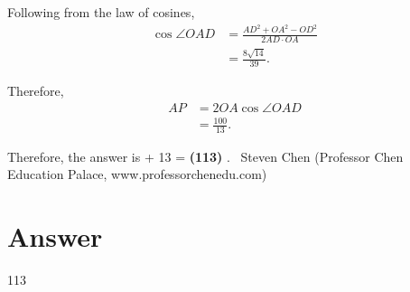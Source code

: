 \documentclass{article}%
\begin{document}
Following from the law of cosines,
\begin{align*}
\cos \angle OAD & = \frac{AD^2 + OA^2 - OD^2}{2 AD \cdot OA} \\
& = \frac{8 \sqrt{14}}{39} .
\end{align*}

Therefore,
\begin{align*}
AP & = 2 OA \cos \angle OAD \\
& = \frac{100}{13} .
\end{align*}

Therefore, the answer is  + 13 = {\textbf{(113) }}\].
~Steven Chen (Professor Chen Education Palace, www.professorchenedu.com)%
\section*{Answer}%
113%
\end{document}
